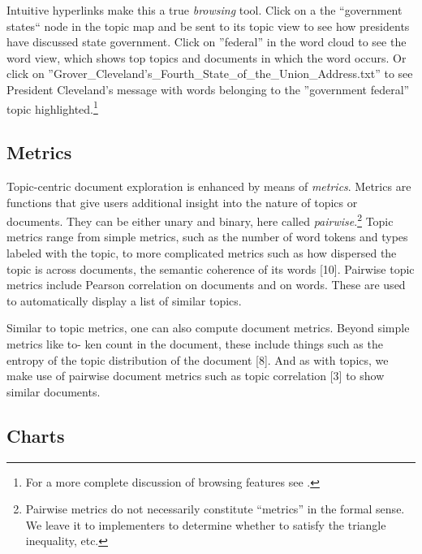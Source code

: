 \documentclass[11pt]{article}
\begin{document}
Intuitive hyperlinks make this a true \textit{browsing} tool. Click on a the
``government states`` node in the topic map and be sent to its topic view to see
how presidents have discussed state government. Click on ''federal'' in the word
cloud to see the word view, which shows top topics and documents in which the
word occurs. Or click on ''Grover\_\allowbreak{}Cleveland's\_\allowbreak{}Fourth\_\allowbreak{}State\_\allowbreak{}of\_\allowbreak{}the\_\allowbreak{}Union\_\allowbreak{}Address.txt''
to see President Cleveland's message with words belonging to the ''government federal''
topic highlighted.\footnote{For a more complete discussion
of browsing features see \cite{gardner_browser_2010}.}%

\subsection{Metrics}
Topic-centric document exploration is enhanced by means of \textit{metrics}.
Metrics are functions that give users additional insight into the nature of
topics or documents. They can be either unary and binary,
here called \textit{pairwise}.\footnote{Pairwise metrics do not necessarily
constitute ``metrics'' in the formal sense. We leave it to implementers to
determine whether to satisfy the triangle inequality, etc.} Topic metrics range
from simple metrics, such as the number of word tokens and types labeled with
the topic, to more complicated metrics such as how dispersed the topic is across
documents, the semantic coherence of its words [10]. Pairwise topic metrics
include Pearson correlation on documents and on words. These are used to automatically
display a list of similar topics.

Similar to topic metrics, one can also compute document metrics. Beyond simple metrics like to-
ken count in the document, these include things such as the entropy of the topic distribution of
the document [8]. And as with topics, we make use of pairwise document metrics such as topic
correlation [3] to show similar documents.

\subsection{Charts}

\end{document}
